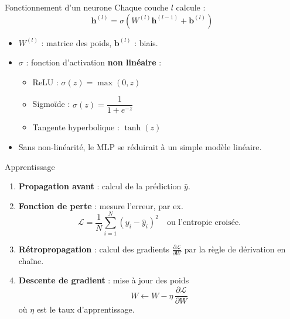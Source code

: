 \documentclass{beamer}
\begin{document}
\begin{frame}{Fonctionnement d'un neurone}
  Chaque couche $l$ calcule :
  \[
    \mathbf{h}^{(l)} = \sigma\!\left( W^{(l)} \mathbf{h}^{(l-1)} + \mathbf{b}^{(l)} \right)
  \]
  \begin{itemize}
    \item $W^{(l)}$ : matrice des poids, $\mathbf{b}^{(l)}$ : biais.
    \item $\sigma$ : fonction d'activation \textbf{non linéaire} :
    \begin{itemize}
      \item ReLU : $\sigma(z) = \max(0, z)$
      \item Sigmoïde : $\sigma(z) = \dfrac{1}{1 + e^{-z}}$
      \item Tangente hyperbolique : $\tanh(z)$
    \end{itemize}
    \item Sans non-linéarité, le MLP se réduirait à un simple modèle linéaire.
  \end{itemize}
\end{frame}

\begin{frame}{Apprentissage}
  \begin{enumerate}
    \item \textbf{Propagation avant} : calcul de la prédiction $\hat{y}$.
    \item \textbf{Fonction de perte} : mesure l'erreur, par ex.
      \[
        \mathcal{L} = \frac{1}{N}\sum_{i=1}^{N} (y_i - \hat{y}_i)^2
        \quad \text{ou l'entropie croisée.}
      \]
    \item \textbf{Rétropropagation} : calcul des gradients $\frac{\partial \mathcal{L}}{\partial W}$ par la règle de dérivation en chaîne.
    \item \textbf{Descente de gradient} : mise à jour des poids
      \[
        W \leftarrow W - \eta \, \frac{\partial \mathcal{L}}{\partial W}
      \]
      où $\eta$ est le taux d'apprentissage.
  \end{enumerate}
\end{frame}
\end{document}
